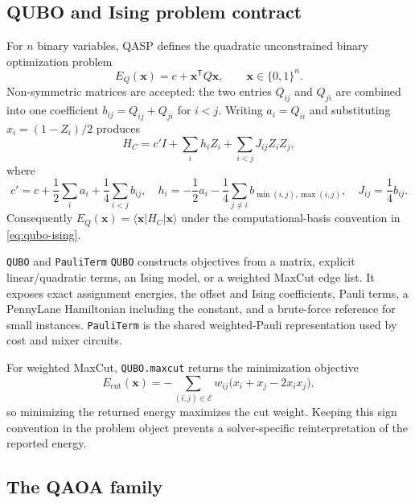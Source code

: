\documentclass[10pt]{article}
\newcommand{\code}[1]{\texttt{#1}}
\begin{document}
\subsection{QUBO and Ising problem contract}
\label{sec:qubo-contract}

For $n$ binary variables, QASP defines the quadratic unconstrained binary
optimization problem
\begin{equation}
  E_Q(\bm x)=c+\bm x^{\mathsf T}Q\bm x,
  \qquad \bm x\in\{0,1\}^{n}.
  \label{eq:qubo}
\end{equation}
Non-symmetric matrices are accepted: the two entries $Q_{ij}$ and $Q_{ji}$
are combined into one coefficient $b_{ij}=Q_{ij}+Q_{ji}$ for $i<j$.
Writing $a_i=Q_{ii}$ and substituting $x_i=(1-Z_i)/2$ produces
\begin{equation}
  H_C=c'I+\sum_i h_i Z_i+\sum_{i<j}J_{ij}Z_iZ_j,
  \label{eq:qubo-ising}
\end{equation}
where
\begin{equation}
  c'=c+\frac12\sum_i a_i+\frac14\sum_{i<j}b_{ij},\quad
  h_i=-\frac12a_i-\frac14\sum_{j\ne i}b_{\min(i,j),\max(i,j)},\quad
  J_{ij}=\frac14b_{ij}.
  \label{eq:qubo-ising-coefficients}
\end{equation}
Consequently $E_Q(\bm x)=\langle\bm x\rvert H_C\lvert\bm x\rangle$
under the computational-basis convention in \cref{eq:qubo-ising}.

\begin{qaspfeature}{\code{QUBO} and \code{PauliTerm}}
\code{QUBO} constructs objectives from a matrix, explicit linear/quadratic
terms, an Ising model, or a weighted MaxCut edge list.  It exposes exact
assignment energies, the offset and Ising coefficients, Pauli terms, a
PennyLane Hamiltonian including the constant, and a brute-force reference for
small instances.  \code{PauliTerm} is the shared weighted-Pauli representation
used by cost and mixer circuits.
\end{qaspfeature}

For weighted MaxCut, \code{QUBO.maxcut} returns the minimization objective
\begin{equation}
  E_{\mathrm{cut}}(\bm x)
  =-\sum_{(i,j)\in\mathcal E}w_{ij}
     \bigl(x_i+x_j-2x_ix_j\bigr),
  \label{eq:maxcut-qubo}
\end{equation}
so minimizing the returned energy maximizes the cut weight.  Keeping this sign
convention in the problem object prevents a solver-specific reinterpretation
of the reported energy.

\subsection{The QAOA family}
\label{sec:qaoa-family}
\end{document}
